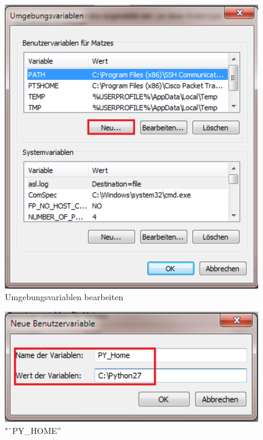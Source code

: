 \begin{appendix}
        \begin{figure}[ht]
            \centering
            \includegraphics[width=0.99\textwidth]{src/pictures/win-umgebungsvar.png}
            \caption{Umgebungsvariablen bearbeiten}
            \label{img:win:sysvar3}
        \end{figure}

        \begin{figure}[ht]
            \centering
            \includegraphics[width=0.99\textwidth]{src/pictures/py-home.png}
            \caption{"`PY\_HOME''}
            \label{img:py:home}
        \end{figure}


\end{appendix}
